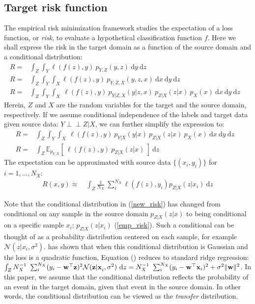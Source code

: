 \documentclass[twoside,11pt]{article}
\def\ci{\perp\!\!\!\perp}
\begin{document}
\subsection{Target risk function}
The empirical risk minimization framework studies the expectation of a loss function, or \emph{risk}, to evaluate a hypothetical classification function $f$. Here we shall express the risk in the target domain as a function of the source domain and a conditional distribution: 
\begin{align}
R =& \int_{Z}\int_{Y}\ell(f(z),y) \ p_{Y,Z}(y,z) \ \mathrm{d}y \ \mathrm{d}z  & \nonumber \\
R=& \int_{Z}\int_{Y}\int_{X} \ell(f(z),y) \ p_{Y,Z,X}(y,z,x) \ \mathrm{d}x \ \mathrm{d}y \ \mathrm{d}z & \nonumber \\
R =& \int_{Z}\int_{Y}\int_{X} \ \ell(f(z),y) \ p_{Y|Z,X}(y|z,x) \ p_{Z|X}(z|x)  \ p_{X}(x) \ \mathrm{d}x \ \mathrm{d}y \ \mathrm{d}z & \nonumber 
\end{align}
Herein, $Z$ and $X$ are the random variables for the target and the source domain, respectively. If we assume conditional independence of the labels and target data given source data: $Y \ci Z | X$, we can further simplify the expression to:
\begin{align}
R =& \int_{Z}\int_{Y}\int_{X} \ \ell(f(z),y) \ p_{Y|X}(y|x) \ p_{Z|X}(z|x)  \ p_{X}(x) \ \mathrm{d}x \ \mathrm{d}y \ \mathrm{d}z &  \nonumber \\
R =& \int_{Z} \mathbb{E}_{p_{Y,X}}\left[ \ \ell(f(z),y) \ p_{Z|X}(z|x) \ \right] \ \mathrm{d}z & \label{new_risk} 
\end{align}
The expectation can be approximated with source data $\{(x_{i},y_{i})\}$ for $i=1,\dots, N_{X}$:
\begin{align}
R(x,y) \approx &\  \int_{Z} \frac{1}{N_{X}} \ \sum_{i}^{N_{X}} \ell(f(z),y_{i}) p_{Z|X} (z|x_{i}) \ \mathrm{d}z \label{emp_risk}
\end{align}

Note that the conditional distribution in (\ref{new_risk}) has changed from conditional on any sample in the source domain $p_{Z|X}(z|x)$ to being conditional on a specific sample $x_{i}$; $p_{Z|X}(z|x_{i})$ (\ref{emp_risk}). Such a conditional can be thought of as a probability distribution centered on each sample, for example $\mathcal{N}(z| x_{i}, \sigma^{2})$. \cite{bishop1995training} has shown that when this conditional distribution is Gaussian and the loss is a quadratic function, Equation (\label{emp_risk}) reduces to standard ridge regression: $\int_{Z} N_{X}^{-1} \ \sum_{i}^{N_{X}} (y_{i}-{\bf w^{\top}z})^{2} \mathcal{N}({\bf z|x}_{i}, \sigma^{2}) \ \mathrm{d}z = N_{X}^{-1} \ \sum_{i}^{N_{X}} (y_{i}-{\bf w^{\top}x}_{i})^{2} + \sigma^{2}\|{\bf w} \|^{2}$. In this paper, we assume that the conditional distribution reflects the probability of an event in the target domain, given that event in the source domain. In other words, the conditional distribution can be viewed as the \emph{transfer} distribution. 
\end{document}
